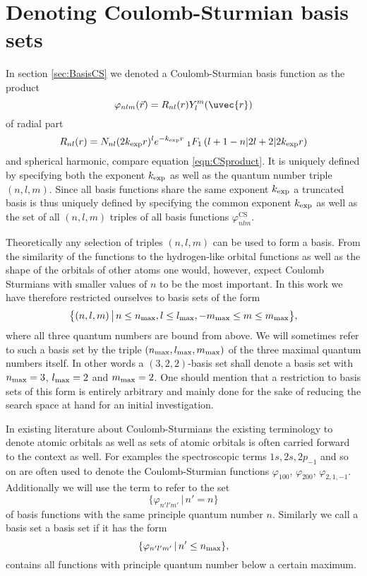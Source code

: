 \section{Denoting Coulomb-Sturmian basis sets}
In section \vref{sec:BasisCS}
we denoted a Coulomb-Sturmian basis function as the product
\[
	\varphi_{nlm}(\vec{r}) = R_{nl}(r) Y_l^m(\uvec{r})
\]
of radial part 
\[
	R_{nl}(r) = N_{nl} (2k_\text{exp} r)^l e^{-k_\text{exp} r}
	\;_1F_1\left(l+1-n \middle| 2l+2 \middle|2k_\text{exp} r\right)
\]
and spherical harmonic, compare equation \eqref{eqn:CSproduct}.
It is uniquely defined by specifying both the \CS exponent $k_\text{exp}$
as well as the quantum number triple $(n,l,m)$.
Since all basis functions share the same exponent $k_\text{exp}$
a truncated \CS basis is thus uniquely defined by specifying
the common exponent $k_\text{exp}$ as well as the set of all $(n, l, m)$
triples of all basis functions $\varphi^\text{CS}_{nlm}$.

Theoretically any selection of triples $(n, l, m)$ can be used to form a \CS basis.
From the similarity of the \CS functions to the hydrogen-like orbital functions
as well as the shape of the orbitals of other atoms
one would, however, expect Coulomb Sturmians with smaller values of $n$
to be the most important.
In this work we have therefore restricted ourselves to \CS basis sets
of the form
\[ \big\{ (n, l, m) \, \big| \, n \le n_\text{max}, l \le l_\text{max}, -m_\text{max} \le m \le m_\text{max} \big\}, \]
\ie where all three quantum numbers are bound from above.
We will sometimes refer to such a \CS basis set by the triple
$(n_\text{max}, l_\text{max}, m_\text{max})$ of the three maximal quantum numbers itself.
In other words a $(3,2,2)$-basis set shall denote a basis set with
$n_\text{max} = 3$, $l_\text{max} = 2$ and $m_\text{max} = 2$.
One should mention that a restriction to basis sets of this form
is entirely arbitrary
and mainly done for the sake of reducing the search space at hand
for an initial investigation.

In existing literature about Coulomb-Sturmians the existing terminology
to denote atomic orbitals as well as sets of atomic orbitals is often carried
forward to the \CS context as well.
For examples the spectroscopic terms $1s, 2s, 2p_{-1}$ and so on
are often used to denote the Coulomb-Sturmian functions
$\varphi_{100}$, $\varphi_{200}$, $\varphi_{2,1,-1}$.
Additionally we will use the term  to refer to the set
\[ \{ \varphi_{n'l'm'} \, | \, n' = n \} \]
of \CS basis functions with the same principle quantum number $n$.
Similarly we call a \CS basis set a  basis set
if it has the form
\[ \{ \varphi_{n'l'm'} \, | \, n' \leq n_\text{max} \}, \]
\ie contains all \CS functions with principle quantum number
below a certain maximum.
